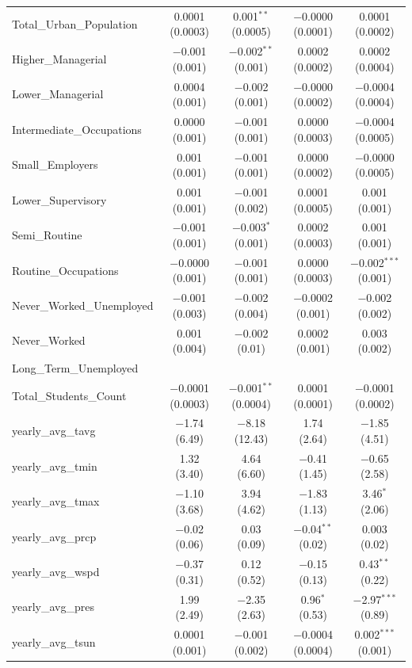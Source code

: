 \documentclass[12pt,letterpaper]{article}
\begin{document}
\begin{table}[!htbp]
\begin{adjustbox}{width=\textwidth}
\begin{tabular}{@{\extracolsep{5pt}}lcccc}
			Total\_Urban\_Population & 0.0001 (0.0003) & 0.001$^{**}$ (0.0005) & $-$0.0000 (0.0001) & 0.0001 (0.0002) \\ 
			Higher\_Managerial & $-$0.001 (0.001) & $-$0.002$^{**}$ (0.001) & 0.0002 (0.0002) & 0.0002 (0.0004) \\ 
			Lower\_Managerial & 0.0004 (0.001) & $-$0.002 (0.001) & $-$0.0000 (0.0002) & $-$0.0004 (0.0004) \\ 
			Intermediate\_Occupations & 0.0000 (0.001) & $-$0.001 (0.001) & 0.0000 (0.0003) & $-$0.0004 (0.0005) \\ 
			Small\_Employers & 0.001 (0.001) & $-$0.001 (0.001) & 0.0000 (0.0002) & $-$0.0000 (0.0005) \\ 
			Lower\_Supervisory & 0.001 (0.001) & $-$0.001 (0.002) & 0.0001 (0.0005) & 0.001 (0.001) \\ 
			Semi\_Routine & $-$0.001 (0.001) & $-$0.003$^{*}$ (0.001) & 0.0002 (0.0003) & 0.001 (0.001) \\ 
			Routine\_Occupations & $-$0.0000 (0.001) & $-$0.001 (0.001) & 0.0000 (0.0003) & $-$0.002$^{***}$ (0.001) \\ 
			Never\_Worked\_Unemployed & $-$0.001 (0.003) & $-$0.002 (0.004) & $-$0.0002 (0.001) & $-$0.002 (0.002) \\ 
			Never\_Worked & 0.001 (0.004) & $-$0.002 (0.01) & 0.0002 (0.001) & 0.003 (0.002) \\ 
			Long\_Term\_Unemployed &  &  &  &  \\ 
			Total\_Students\_Count & $-$0.0001 (0.0003) & $-$0.001$^{**}$ (0.0004) & 0.0001 (0.0001) & $-$0.0001 (0.0002) \\ 
			yearly\_avg\_tavg & $-$1.74 (6.49) & $-$8.18 (12.43) & 1.74 (2.64) & $-$1.85 (4.51) \\ 
			yearly\_avg\_tmin & 1.32 (3.40) & 4.64 (6.60) & $-$0.41 (1.45) & $-$0.65 (2.58) \\ 
			yearly\_avg\_tmax & $-$1.10 (3.68) & 3.94 (4.62) & $-$1.83 (1.13) & 3.46$^{*}$ (2.06) \\ 
			yearly\_avg\_prcp & $-$0.02 (0.06) & 0.03 (0.09) & $-$0.04$^{**}$ (0.02) & 0.003 (0.02) \\ 
			yearly\_avg\_wspd & $-$0.37 (0.31) & 0.12 (0.52) & $-$0.15 (0.13) & 0.43$^{**}$ (0.22) \\ 
			yearly\_avg\_pres & 1.99 (2.49) & $-$2.35 (2.63) & 0.96$^{*}$ (0.53) & $-$2.97$^{***}$ (0.89) \\ 
			yearly\_avg\_tsun & 0.0001 (0.001) & $-$0.001 (0.002) & $-$0.0004 (0.0004) & 0.002$^{***}$ (0.001) \\ 

\end{tabular}
\end{adjustbox}
\end{table}
\end{document}
